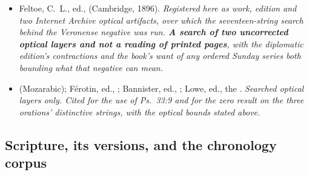 \begin{itemize}[leftmargin=1.2em, itemsep=0.15em]
{registered Internet Archive scan of this printing, its bytes hash-matched to the
registered digest before a page was opened, and all three read exactly as that
edition prints them.
\textbf{One digitisation of the 1861 book and not a collation of two copies},
and \textbf{who made the translation is not established, so the edition is named
and no translator is.}}
\item Feltoe, C.~L., ed.,  (Cambridge, 1896).
\textit{Registered here as work, edition and two Internet Archive optical
artifacts, over which the seventeen-string search behind the Veronense negative
was run. \textbf{A search of two uncorrected optical layers and not a reading
of printed pages}, with the diplomatic edition's contractions and the book's
want of any ordered Sunday series both bounding what that negative can mean.}
\item {} (Mozarabic); Férotin, ed., ; Bannister, ed., ; Lowe, ed., the
. \textit{Searched optical layers only. Cited for the
 use of Ps.~33:9 and for the zero result on the three
orations' distinctive strings, with the optical bounds stated above.}
\end{itemize}

\subsection*{Scripture, its versions, and the chronology corpus}

